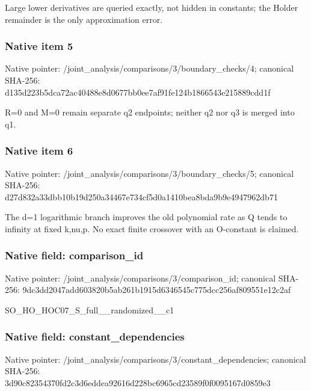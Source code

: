 \documentclass[10pt,a4paper]{article}
\begin{document}
\begingroup\raggedright\sloppy Large lower derivatives are queried exactly,\allowbreak{} not hidden in constants;\allowbreak{} the Holder remainder is the only approximation error.\par\endgroup

\subsubsection{Native item 5}
Native pointer: /joint\_\allowbreak{}analysis/comparisons/3/boundary\_\allowbreak{}checks/4; canonical SHA-256: d135d223b5dca72ac40488e8d0677bb0ee7af91fe124b1866543e215889cdd1f

\begingroup\raggedright\sloppy R=\allowbreak{}0 and M=\allowbreak{}0 remain separate q2 endpoints;\allowbreak{} neither q2 nor q3 is merged into q1.\par\endgroup

\subsubsection{Native item 6}
Native pointer: /joint\_\allowbreak{}analysis/comparisons/3/boundary\_\allowbreak{}checks/5; canonical SHA-256: d27d832a33dbb10b19d250a34467e734cf5d0a1410bea8bda9b9e4947962db71

\begingroup\raggedright\sloppy The d=\allowbreak{}1 logarithmic branch improves the old polynomial rate as Q tends to infinity at fixed k,\allowbreak{}nu,\allowbreak{}p. No exact finite crossover with an O-constant is claimed.\par\endgroup

\subsubsection{Native field: comparison\_\allowbreak{}id}
Native pointer: /joint\_\allowbreak{}analysis/comparisons/3/comparison\_\allowbreak{}id; canonical SHA-256: 9dc3dd2047add603820b5ab261b1915d6346545c775dcc256af809551e12c2af

\begingroup\raggedright\sloppy SO\_\allowbreak{}HO\_\allowbreak{}HOC07\_\allowbreak{}S\_\allowbreak{}full\_\allowbreak{}\_\allowbreak{}randomized\_\allowbreak{}\_\allowbreak{}c1\par\endgroup

\subsubsection{Native field: constant\_\allowbreak{}dependencies}
Native pointer: /joint\_\allowbreak{}analysis/comparisons/3/constant\_\allowbreak{}dependencies; canonical SHA-256: 3d90c82354370fd2c3d6eddea92616d228bc6965cd23589f0f0095167d0859e3
\end{document}
